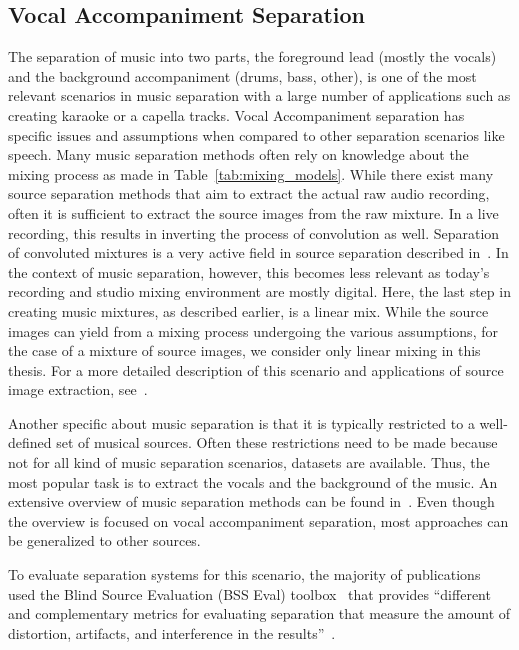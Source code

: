 \subsection{Vocal Accompaniment Separation}
The separation of music into two parts, the foreground lead (mostly the vocals) and the background accompaniment (drums, bass, other), is one of the most relevant scenarios in music separation with a large number of applications such as creating karaoke or a capella tracks.
Vocal Accompaniment separation has specific issues and assumptions when compared to other separation scenarios like speech.
Many music separation methods often rely on knowledge about the mixing process as made in Table~\ref{tab:mixing_models}.
While there exist many source separation methods that aim to extract the actual raw audio recording, often it is sufficient to extract the source images from the raw mixture.
In a live recording, this results in inverting the process of convolution as well.
Separation of convoluted mixtures is a very active field in source separation described in~\cite{pedersen07}.
In the context of music separation, however, this becomes less relevant as today's recording and studio mixing environment are mostly digital.
Here, the last step in creating music mixtures, as described earlier, is a linear mix.
While the source images can yield from a mixing process undergoing the various assumptions, for the case of a mixture of source images, we consider only linear mixing in this thesis.
For a more detailed description of this scenario and applications of source image extraction, see~\cite{sturmel12}.
\par
Another specific about music separation is that it is typically restricted to a well-defined set of musical sources.
Often these restrictions need to be made because not for all kind of music separation scenarios, datasets are available.
Thus, the most popular task is to extract the vocals and the background of the music.
An extensive overview of music separation methods can be found in~\cite{rafii18}.
Even though the overview is focused on vocal accompaniment separation, most approaches can be generalized to other sources.
\par
To evaluate separation systems for this scenario, the majority of publications used the Blind Source Evaluation (BSS Eval) toolbox~\cite{fevotte05,vincent06} that provides ``different and complementary metrics for evaluating separation that measure the amount of distortion, artifacts, and interference in the results''~\cite{rafii18}.

